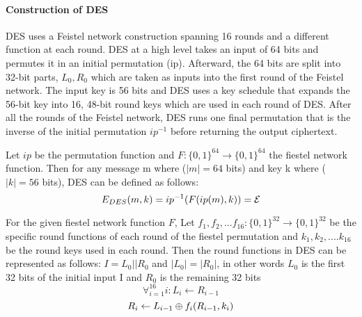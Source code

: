 

\newpage

\paragraph{Construction of DES}
DES uses a Feistel network construction spanning 16 rounds and a different function at each round. DES at a high level takes an input of 64 bits and permutes it in an initial permutation (ip). Afterward, the 64 bits are split into 32-bit parts, \( L_0, R_0\) which are taken as inputs into the first round of the Feistel network. The input key is 56 bits and DES uses a key schedule that expands the 56-bit key into 16, 48-bit round keys which are used in each round of DES. After all the rounds of the Feistel network, DES runs one final permutation that is the inverse of the initial permutation $ip^{-1}$ before returning the output ciphertext. \newline \newline


Let $ip$ be the permutation function and $F : \{0,1\}^{64} \to \{0,1\}^{64}$ the fiestel network function. Then for any message m where (\( |m| = 64 \) bits) and key k where (\( |k| = 56 \) bits), DES can be defined as follows:
	\[ {E}_{DES} (m,k) = {ip}^{-1}(F({ip}(m), k)) = {\cal E} \] 


 For the given fiestel network function $F$, Let $f_1, f_2, ... f_{16} : \{0,1\}^{32} \to \{0,1\}^{32}$ be the specific round functions of each round of the fiestel permutation and \(k_1, k_2, .... k_16 \) be the round keys used in each round. Then the round functions in DES can be represented as follows: \newline
\( I = L_0 || R_0 \)  and \(|L_0| = |R_0|\), in other words $L_0$ is the first 32 bits of the initial input I and $R_0$ is the remaining 32 bits  \newline
\[\forall^{16}_{i=1} i : L_i \leftarrow R_{i-1} \] \[ R_i \leftarrow L_{i-1} {\:\oplus\:} {f_i}(R_{i-1}, k_i) \]



